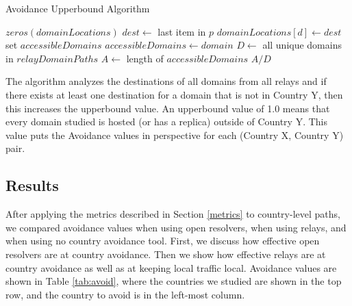 \begin{algorithm}
\caption{Avoidance Upperbound Algorithm}
\label{upperbound_algo}
\begin{algorithmic}[1]
    \State $zeros(domainLocations)$
		\State $dest \gets $ last item in $p$
		\State $domainLocations[d] \gets dest$
    \EndFor
    \State set $accessibleDomains$
    \State $accessibleDomains \gets domain$
    \EndIf
    \EndFor
    \State $D \gets$ all unique domains in  $relayDomainPaths$
    \State $A \gets$ length of $accessibleDomains$
    \State \Return $A / D$
\EndFunction
\end{algorithmic}
\end{algorithm}

The algorithm analyzes the destinations of all domains from all relays and if there exists at least one destination for a domain that is not in Country Y, then this increases the upperbound value.  An upperbound value of 1.0 means that every domain studied is hosted (or has a replica) outside of Country Y.  This value puts the Avoidance values in perspective for each (Country X, Country Y) pair. 

\subsection{Results}
After applying the metrics described in Section \ref{metrics} to country-level paths, we compared avoidance values when using open resolvers, when using relays, and when using no country avoidance tool.  First, we discuss how effective open resolvers are at country avoidance.  Then we show how effective relays are at country avoidance as well as at keeping local traffic local.  Avoidance values are shown in Table \ref{tab:avoid}, where the countries we studied are shown in the top row, and the country to avoid is in the left-most column.  

